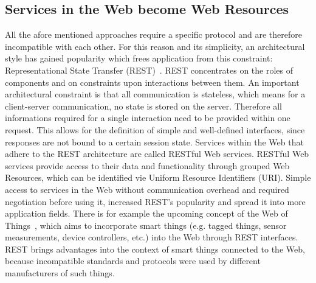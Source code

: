 \subsection{Services in the Web become Web Resources}
All the afore mentioned approaches require a specific protocol and are therefore incompatible with each other.
For this reason and its simplicity, an architectural style has gained popularity which frees application from this constraint: Representational State Transfer (\textrm{REST})~\cite{fielding2000architectural}.
\textrm{REST} concentrates on the roles of components and on constraints upon interactions between them.
An important architectural constraint is that all communication is stateless, which means for a client-server communication, no state is stored on the server.
Therefore all informations required for a single interaction need to be provided within one request.
This allows for the definition of simple and well-defined interfaces, since responses are not bound to a certain session state. 
Services within the Web that adhere to the \textrm{REST} architecture are called \textrm{RESTful} Web services.
\textrm{RESTful} Web services provide access to their data and functionality through grouped \textrm{Web Resources}, which can be identified vie Uniform Resource Identifiers (\textrm{URI}).
Simple access to services in the Web without communication overhead and required negotiation before using it, increased \textrm{REST}'s popularity and spread it into more application fields.
There is for example the upcoming concept of the \textrm{Web of Things}~\cite{5678452}, which aims to incorporate smart things (e.g. tagged things, sensor measurements, device controllers, etc.) into the Web through \textrm{REST} interfaces.
\textrm{REST} brings advantages into the context of smart things connected to the Web, because incompatible standards and protocols were used by different manufacturers of such things.




